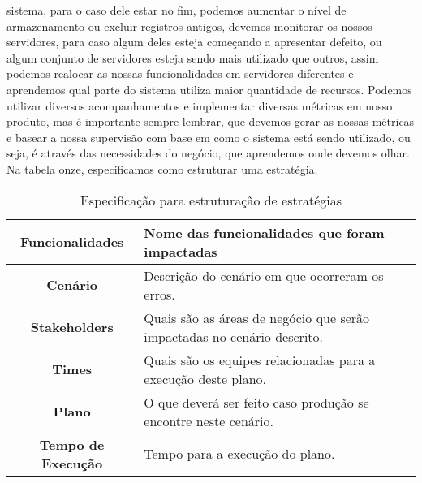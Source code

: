       sistema, para o caso dele estar no fim, podemos aumentar o nível de armazenamento
      ou excluir registros antigos, devemos monitorar os nossos servidores, para
      caso algum deles esteja começando a apresentar defeito, ou algum conjunto
      de servidores esteja sendo mais utilizado que outros, assim podemos realocar
      as nossas funcionalidades em servidores diferentes e aprendemos qual parte
      do sistema utiliza maior quantidade de recursos. Podemos utilizar diversos
      acompanhamentos e implementar diversas métricas em nosso produto, mas é
      importante sempre lembrar, que devemos gerar as nossas métricas e basear a
      nossa supervisão com base em como o sistema está sendo utilizado, ou seja,
      é através das necessidades do negócio, que aprendemos onde devemos olhar.
      Na tabela onze, especificamos como estruturar uma estratégia.\newline

      \begin{table}[h!]
        \centering
        \begin{tabular}{|c|p{10cm}|}
          \hline
          \textbf{Funcionalidades} &
          Nome das funcionalidades que foram impactadas \\ \hline
          \textbf{Cenário} &
          Descrição do cenário em que ocorreram os erros. \\ \hline
          \textbf{Stakeholders} &
          Quais são as áreas de negócio que serão impactadas no cenário descrito. \\ \hline
          \textbf{Times} &
          Quais são os equipes relacionadas para a execução deste plano. \\ \hline
          \textbf{Plano} &
          O que deverá ser feito caso produção se encontre neste cenário. \\ \hline
          \textbf{Tempo de Execução} &
          Tempo para a execução do plano. \\ \hline
        \end{tabular}
        \caption{Especificação para estruturação de estratégias}
        \label{Tabela:11}
      \end{table}

